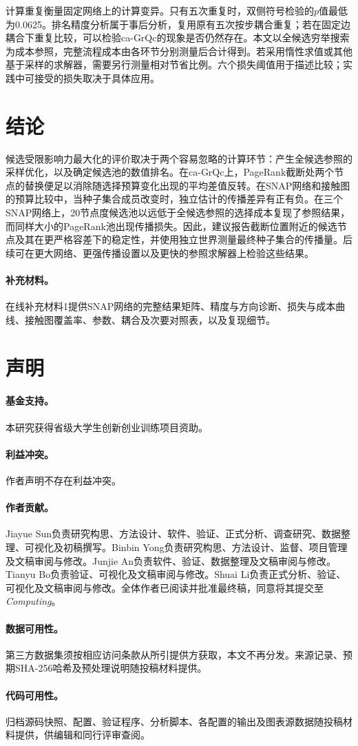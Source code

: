 \documentclass[smallextended]{svjour3}
\begin{document}
计算重复衡量固定网络上的计算变异。只有五次重复时，双侧符号检验的$p$值最低为0.0625。排名精度分析属于事后分析，复用原有五次按步耦合重复；若在固定边耦合下重复比较，可以检验ca-GrQc的现象是否仍然存在。本文以全候选穷举搜索为成本参照，完整流程成本由各环节分别测量后合计得到。若采用惰性求值或其他基于采样的求解器，需要另行测量相对节省比例。六个损失阈值用于描述比较；实践中可接受的损失取决于具体应用。

\section{结论}
候选受限影响力最大化的评价取决于两个容易忽略的计算环节：产生全候选参照的采样优化，以及确定候选池的数值排名。在ca-GrQc上，PageRank截断处两个节点的替换便足以消除随选择预算变化出现的平均差值反转。在SNAP网络和接触图的预算比较中，当种子集合成员改变时，独立估计的传播差异有正有负。在三个SNAP网络上，20节点度候选池以远低于全候选参照的选择成本复现了参照结果，而同样大小的PageRank池出现传播损失。因此，建议报告截断位置附近的候选节点及其在更严格容差下的稳定性，并使用独立世界测量最终种子集合的传播量。后续可在更大网络、更强传播设置以及更快的参照求解器上检验这些结果。

\paragraph{补充材料。}在线补充材料1提供SNAP网络的完整结果矩阵、精度与方向诊断、损失与成本曲线、接触图覆盖率、参数、耦合及次要对照表，以及复现细节。
\section*{声明}
\paragraph{基金支持。}本研究获得省级大学生创新创业训练项目资助。
\paragraph{利益冲突。}作者声明不存在利益冲突。
\paragraph{作者贡献。}Jiayue Sun负责研究构思、方法设计、软件、验证、正式分析、调查研究、数据整理、可视化及初稿撰写。Binbin Yong负责研究构思、方法设计、监督、项目管理及文稿审阅与修改。Junjie An负责软件、验证、数据整理及文稿审阅与修改。Tianyu Bo负责验证、可视化及文稿审阅与修改。Shuai Li负责正式分析、验证、可视化及文稿审阅与修改。全体作者已阅读并批准最终稿，同意将其提交至\textit{Computing}。
\paragraph{数据可用性。}第三方数据集须按相应访问条款从所引提供方获取，本文不再分发。来源记录、预期SHA-256哈希及预处理说明随投稿材料提供。
\paragraph{代码可用性。}归档源码快照、配置、验证程序、分析脚本、各配置的输出及图表源数据随投稿材料提供，供编辑和同行评审查阅。

\end{document}
